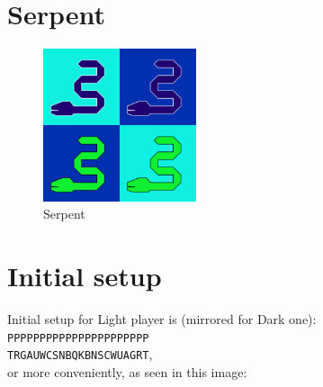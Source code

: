 \documentclass[a5paper,12pt,draft]{book} %
\begin{document}
\clearpage

\section*{Serpent}

\noindent
\begin{figure}
\includegraphics[width=0.4\textwidth, keepaspectratio=true]{../gfx/pieces/13_serpent.png}
\caption{Serpent}
\label{fig:serpent}
\end{figure}

\clearpage

\section*{Initial setup}

Initial setup for Light player is (mirrored for Dark one):
\texttt{PPPPPPPPPPPPPPPPPPPPPP \\
        TRGAUWCSNBQKBNSCWUAGRT}, \\
or more conveniently, as seen in this image:
\end{document}

